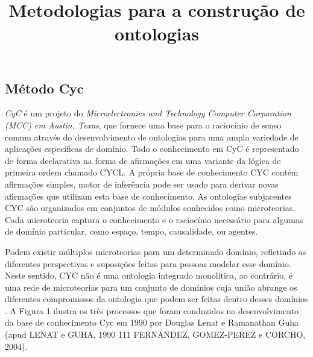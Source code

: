 \documentclass[a4paper]{report}
\title{Metodologias para a construção de ontologias}
\date{} %
\begin{document}
\pagestyle{plain}
\maketitle

\subsection{Método Cyc}

\qquad \textit{CyC} é um projeto do \textit{Microelectronics and Technology Computer Corporation (MCC) em Austin, Texas}, que fornece uma base para o raciocínio de senso comum através do desenvolvimento de ontologias para uma ampla variedade de aplicações específicas de domínio. Todo o conhecimento em CyC é representado de forma declarativa na forma de afirmações em uma variante da lógica de primeira ordem chamado CYCL. A própria base de conhecimento CYC contém afirmações simples, motor de inferência pode ser usado para derivar novas afirmações que utilizam esta base de conhecimento.
As ontologias subjacentes CYC são organizados em conjuntos de módulos conhecidos como microteorias. Cada microteoria captura o conhecimento e o raciocínio necessário para algumas de domínio particular, como espaço, tempo, causalidade, ou agentes.

Podem existir múltiplos microteorias para um determinado domínio, refletindo as diferentes perspectivas e suposições feitas para pessoas modelar esse domínio. Neste sentido, CYC não é uma ontologia integrado monolítica, ao contrário, é uma rede de microteorias para um conjunto de domínios cuja união abrange os diferentes compromissos da ontologia que podem ser feitas dentro desses domínios \cite{Andreia:2010}.
	A Figura 1 ilustra os três processos que foram conduzidos no desenvolvimento da
base de conhecimento Cyc em 1990 por Douglas Lenat e Ramanathan Guha (apud LENAT e GUHA, 1990 111 FERNANDEZ, GOMEZ-PEREZ e CORCHO, 2004).
\end{document}
